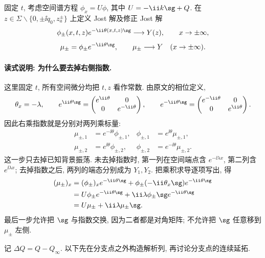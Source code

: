 固定 $t$, 考虑空间谱方程 $\phi_x=U\phi$, 其中 $U=-\ii k\sg+Q$. 在 $z\in\Sigma\mathbin{\backslash}\{0,\pm\ii q_0,z_a^\pm\}$ 上定义 Jost 解及修正 Jost 解
\begin{equation}\label{eq:jost-normalization}
\phi_\pm(x,t,z)e^{-\ii\theta(x,t,z)\sg}\longrightarrow Y(z),\qquad x\to\pm\infty,
\end{equation}
\begin{equation}\label{eq:modified-jost}
\mu_\pm=\phi_\pm e^{-\ii\theta\sg},\qquad \mu_\pm\longrightarrow Y\quad(x\to\pm\infty).
\end{equation}

\paragraph{读式说明: 为什么要去掉右侧指数.}
这里固定 $t$, 所有空间微分均把 $t,z$ 看作常数. 由原文的相位定义,
\[
\theta_x=-\lambda,
\qquad
e^{\ii\theta\sg}
=\begin{pmatrix}e^{\ii\theta}&0\\0&e^{-\ii\theta}\end{pmatrix},
\qquad
e^{-\ii\theta\sg}
=\begin{pmatrix}e^{-\ii\theta}&0\\0&e^{\ii\theta}\end{pmatrix}.
\]
因此右乘指数就是分别对两列乘标量:
\[
\begin{aligned}
\mu_{\pm,1}&=e^{-\ii\theta}\phi_{\pm,1},
&\phi_{\pm,1}&=e^{\ii\theta}\mu_{\pm,1},\\
\mu_{\pm,2}&=e^{\ii\theta}\phi_{\pm,2},
&\phi_{\pm,2}&=e^{-\ii\theta}\mu_{\pm,2}.
\end{aligned}
\]
这一步只去掉已知背景振荡. 未去掉指数时, 第一列在空间端点含
$e^{-\ii\lambda x}$, 第二列含 $e^{\ii\lambda x}$;
去掉指数之后, 两列的端态分别成为 $Y_1,Y_2$.
把乘积求导逐项写出, 得
\begin{align*}
(\mu_\pm)_x
&=(\phi_\pm)_xe^{-\ii\theta\sg}
+\phi_\pm(-\ii\theta_x\sg)e^{-\ii\theta\sg}\\
&=U\phi_\pm e^{-\ii\theta\sg}
+\ii\lambda\phi_\pm\sg e^{-\ii\theta\sg}\\
&=U\mu_\pm+\ii\lambda\mu_\pm\sg.
\end{align*}
最后一步允许把 $\sg$ 与指数交换, 因为二者都是对角矩阵;
不允许把 $\sg$ 任意移到 $\mu_\pm$ 左侧.

记 $\Delta Q=Q-Q_\infty$. 以下先在分支点之外构造解析列, 再讨论分支点的连续延拓.

